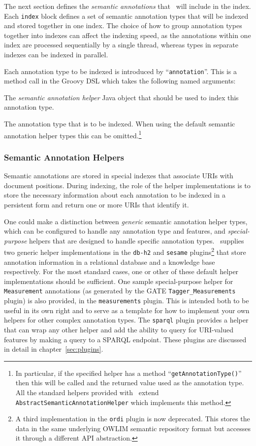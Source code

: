 The next section defines the {\em semantic annotations} that \Mimir\ will
include in the index.  Each \lstinline!index! block defines a set of semantic
annotation types that will be indexed and stored together in one index.  The
choice of how to group annotation types together into indexes can affect the
indexing speed, as the annotations within one index are processed sequentially
by a single thread, whereas types in separate indexes can be indexed in
parallel.

Each annotation type to be indexed is introduced by ``{\tt annotation}''.  This
is a method call in the Groovy DSL which takes the following named arguments:
\bde
\item[helper] The {\em semantic annotation helper} Java object that should be
  used to index this annotation type.
\item[type] The annotation type that is to be indexed.  When using the default
  semantic annotation helper types this can be omitted.\footnote{In particular,
  if the specified helper has a method ``{\tt getAnnotationType()}'' then this
  will be called and the returned value used as the annotation type.  All the
  standard helpers provided with \Mimir\ extend
  {\tt AbstractSemanticAnnotationHelper} which implements this method.}
\ede

\subsubsection{Semantic Annotation Helpers}

Semantic annotations are stored in special indexes that associate URIs with
document positions. During indexing, the role of the helper implementations is 
to store the necessary information about each annotation to be indexed in a
persistent form and return one or more URIs that identify it.

One could make a distinction between {\em generic} semantic annotation helper
types, which can be configured to handle any annotation type and features, and
{\em special-purpose} helpers that are designed to handle specific annotation
types.  \Mimir\ supplies two generic helper implementations in the {\tt db-h2}
and {\tt sesame} plugins\footnote{A third implementation in the {\tt ordi}
plugin is now deprecated.  This stores the data in the same underlying OWLIM
semantic repository format but accesses it through a different API
abstraction.} that store annotation information in a relational database and a
knowledge base respectively.  For the most standard cases, one or other of
these default helper implementations should be sufficient.  One sample
special-purpose helper for {\tt Measurement} annotations (as generated by the
GATE {\tt Tagger\_Measurements} plugin) is also provided, in the
{\tt measurements} plugin.  This is intended both to be useful in its own right
and to serve as a template for how to implement your own helpers for other
complex annotation types.  The {\tt sparql} plugin provides a helper that can
wrap any other helper and add the ability to query for URI-valued features by
making a query to a SPARQL endpoint.  These plugins are discussed in detail in
chapter~\ref{sec:plugins}.

